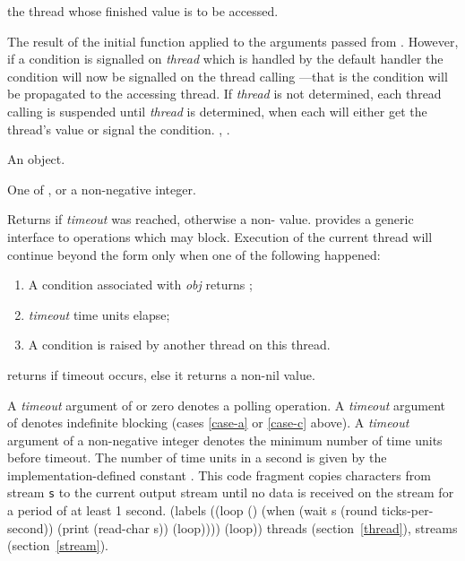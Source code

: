 \begin{optDefinition}
\begin{arguments}
    \item[thread] the thread whose finished value is to be accessed.
\end{arguments}
%
\result%
The result of the initial function applied to the arguments passed from
.  However, if a condition is signalled on {\em
    thread} which is handled by the default handler the condition will now be
signalled on the thread calling ---that is the
condition will be propagated to the accessing thread.
%
\remarks%
If {\em thread} is not determined, each thread calling
 is suspended until {\em thread} is determined, when
each will either get the thread's value or signal the condition.
%
\seealso%
, .

%
\begin{genericargs}
%
    \item[obj] An object.
%
    \item[timeout, \classref{object}] One of \nil{}, \true\/ or a non-negative
    integer.
%
\end{genericargs}
%
\result%
Returns \nil{}\/ if {\em timeout} was reached, otherwise a
non-\nil{}\/ value.
%
\remarks%
 provides a generic interface to operations which may block.
Execution of the current thread will continue beyond the  form
only when one of the following happened:
\begin{enumerate}
    \item\label{case-a} A condition associated with {\em obj} returns \true{};
    \item\label{case-b} {\em timeout} time units elapse;
    \item\label{case-c} A condition is raised by another thread on this thread.
\end{enumerate}
 returns \nil{}\/ if timeout occurs, else it returns a
non-nil value.

A {\em timeout} argument of \nil{}\/ or zero denotes a polling operation.  A {\em
    timeout} argument of \true\/ denotes indefinite blocking (cases \ref{case-a}
or \ref{case-c} above).  A {\em timeout} argument of a non-negative integer
denotes the minimum number of time units before timeout.  The number of time
units in a second is given by the implementation-defined constant
.
%
\examples
This code fragment copies characters from stream {\tt s} to the
current output stream until no data is received on the stream for a
period of at least 1 second.
%
{\codeExample
(labels
  ((loop ()
     (when (wait s (round ticks-per-second))
           (print (read-char s))
           (loop))))
   (loop))
\endCodeExample}
%
\seealso%
threads (section~\ref{thread}), streams (section~\ref{stream}).


\end{optDefinition}
